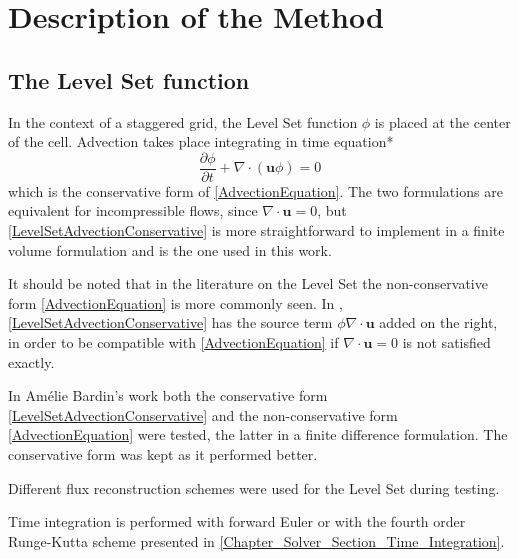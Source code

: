 \documentclass[11pt, a4paper, oneside, openany]{book}
\begin{document}
\section{Description of the Method}\label{Chapter_Implementation_Description_of_the_Method}
\subsection{The Level Set function}
In the context of a staggered grid, the Level Set function $\phi$ is placed at the center of the cell. Advection takes place integrating in time equation*
\begin{equation*}
\dfrac{\partial\phi}{\partial t}+\nabla\cdot\left(\boldsymbol{u}\phi\right)=0\label{LevelSetAdvectionConservative}
\end{equation*}
which is the conservative form of \eqref{AdvectionEquation}. The two formulations are equivalent for incompressible flows, since $\nabla\cdot\boldsymbol{u}=0$, but \eqref{LevelSetAdvectionConservative} is more straightforward to implement in a finite volume formulation and is the one used in this work.\par
It should be noted that in the literature on the Level Set the non-conservative form \eqref{AdvectionEquation} is more commonly seen. In \cite{Zuzio2020}, \eqref{LevelSetAdvectionConservative} has the source term $\phi\nabla\cdot\boldsymbol{u}$ added on the right, in order to be compatible with \eqref{AdvectionEquation} if $\nabla\cdot\boldsymbol{u}=0$ is not satisfied exactly.\par
In Am{\'{e}}lie Bardin's work \cite{Bardin2015} both the conservative form \eqref{LevelSetAdvectionConservative} and the non-conservative form \eqref{AdvectionEquation} were tested, the latter in a finite difference formulation. The conservative form was kept as it performed better.\par
Different flux reconstruction schemes were used for the Level Set during testing.\par
Time integration is performed with forward Euler or with the fourth order Runge-Kutta scheme presented in \ref{Chapter_Solver_Section_Time_Integration}.
\end{document}

